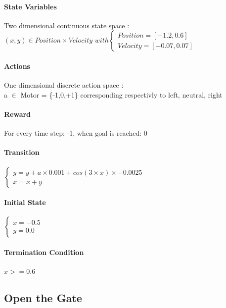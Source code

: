 \documentclass[a4paper,12pt]{article}
\begin{document}
    \paragraph{State Variables}
    Two dimensional continuous state space : \\
    $(x,y) \in Position \times Velocity $
      $ with \left\lbrace \begin{array}{lll} 
      Position = [-1.2, 0.6]\\
      Velocity = [-0.07, 0.07]\
      \end{array} \right.$
    
    
    
    \paragraph{Actions}
     One dimensional discrete action space : \\
     a $\in$ Motor = \{-1,0,+1\} corresponding respectivly to left, neutral, right
     
     \paragraph{Reward}
      For every time step: -1, when goal is reached: 0

    \paragraph{Transition}
     $ \left\lbrace \begin{array}{lll} 
      y = y + a \times 0.001+cos(3 \times x) \times -0.0025\\
      x = x + y
      \end{array} \right.$

    \paragraph{Initial State}
         $ \left\lbrace \begin{array}{lll} 
      x = -0.5\\
      y = 0.0 
      \end{array} \right.$
    
    \paragraph{Termination Condition}
    $x >= 0.6$
    
    
    \newpage
    \subsection{Open the Gate}
\end{document}
